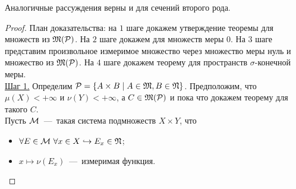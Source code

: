 \begin{note}
	Аналогичные рассуждения верны и для сечений второго рода.
\end{note}
\begin{proof}
    План доказательства: на $1$ шаге докажем утверждение теоремы для множеств из $\mathfrak{M}(\mathcal{P})$. На $2$ шаге докажем для множеств меры $0$. На $3$ шаге представим произвольное измеримое множество через множество меры нуль и множество из $\mathfrak{M}(\mathcal{P})$. На $4$ шаге докажем теорему для пространств $\sigma$-конечной меры.\\
    \underline{Шаг 1.} Определим $\mathcal{P} = \{A \times B \mid A \in \mathfrak{M}, B \in \mathfrak{N} \}$. Предположим, что $\mu(X) < +\infty$ и $\nu(Y) < +\infty$, а $C \in \mathfrak{M}(\mathcal{P})$ и пока что докажем теорему для такого $C$.\\
    Пусть $\mathcal{M}$~---~такая система подмножеств $X \times Y$, что \begin{itemize}
        \item $\forall E \in \mathcal{M} \  \forall x \in X \hookrightarrow E_x \in \mathfrak{N}$;
        \item $x \mapsto \nu(E_x)$~---~измеримая функция.
    \end{itemize}


\end{proof}

